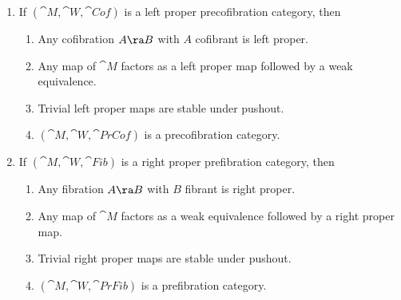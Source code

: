 \begin{thm}
\label{thm:leftproperstruct}
\mbox{}
\begin{enumerate}
\item
If $({\cat M}, {\cat W}, {\cat Cof})$ is a left proper precofibration category, then 
\begin{enumerate}
\item
Any cofibration $A \ra B$ with $A$ cofibrant is left proper.
\item
Any map of ${\cat M}$ factors as a left proper map followed by a weak equivalence.
\item
Trivial left proper maps are stable under pushout.
\item
$({\cat M}, {\cat W}, {\cat PrCof})$ is a precofibration category.
\end{enumerate}
\item
If $({\cat M}, {\cat W}, {\cat Fib})$ is a right proper prefibration category, then 
\begin{enumerate}
\item
Any fibration $A \ra B$ with $B$ fibrant is right proper.
\item
Any map of ${\cat M}$ factors as a weak equivalence followed by a right proper map.
\item
Trivial right proper maps are stable under pushout.
\item
$({\cat M}, {\cat W}, {\cat PrFib})$ is a prefibration category.
\end{enumerate}
\end{enumerate}
\end{thm}


